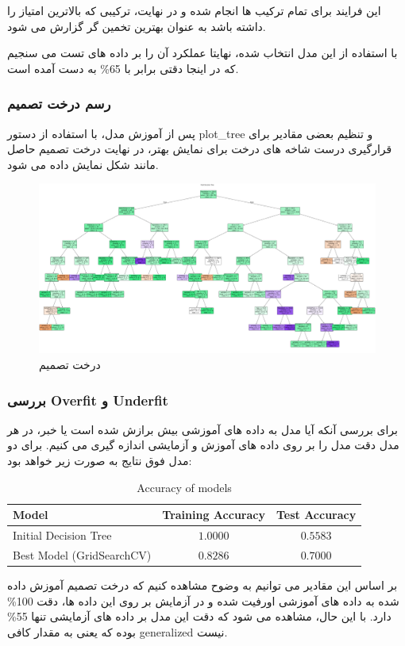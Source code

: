 \documentclass{article}
\begin{document}
این فرایند برای تمام ترکیب ها انجام شده و در نهایت، ترکیبی که بالاترین امتیاز را داشته باشد به عنوان بهترین تخمین گر گزارش می شود.

با استفاده از این مدل انتخاب شده، نهایتا عملکرد آن را بر داده های تست می سنجیم که در اینجا دقتی برابر با 65\% به دست آمده است.

\subsubsection{رسم درخت تصمیم}

پس از آموزش مدل، با استفاده از دستور plot\_tree و تنظیم بعضی مقادیر برای قرارگیری درست شاخه های درخت برای نمایش بهتر، در نهایت درخت تصمیم حاصل مانند شکل نمایش داده می شود.

\begin{figure}
    \centering
    \includegraphics[width=1\linewidth]{Dt.png}
    \caption{درخت تصمیم}
    \label{fig:dt}
\end{figure}

\subsubsection{بررسی Overfit و Underfit}
برای بررسی آنکه آیا مدل به داده های آموزشی بیش برازش شده است یا خبر، در هر مدل دقت مدل را بر روی داده های آموزش و آزمایشی اندازه گیری می کنیم. برای دو مدل فوق نتایج به صورت زیر خواهد بود:
\begin{table}[h!]
\centering
\begin{tabular}{|l|c|c|}
\hline
\textbf{Model} & \textbf{Training Accuracy} & \textbf{Test Accuracy} \\
\hline
Initial Decision Tree & $1.0000$ & $0.5583$ \\
Best Model (GridSearchCV) & $0.8286$ & $0.7000$ \\
\hline
\end{tabular}
\caption{Accuracy of models}
\label{tab:model_accuracy}
\end{table}
بر اساس این مقادیر می توانیم به وضوح مشاهده کنیم که درخت تصمیم آموزش داده شده به  داده های آموزشی اورفیت شده و در آزمایش بر روی این داده ها، دقت 100\% دارد. با این حال، مشاهده می شود که دقت این مدل بر داده های آزمایشی تنها 55\% بوده که یعنی به مقدار کافی generalized نیست.
\end{document}
